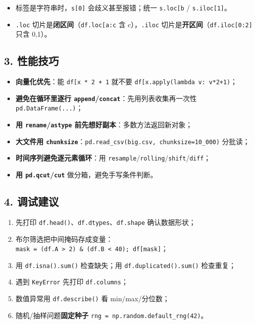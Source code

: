 \begin{itemize}
\tightlist
\item
  标签是字符串时，\texttt{s{[}0{]}} 会歧义甚至报错；统一
  \texttt{s.loc{[}\textquotesingle{}b\textquotesingle{}{]}} /
  \texttt{s.iloc{[}1{]}}。
\item
  \texttt{.loc}
  切片是\textbf{闭区间}（\texttt{df.loc{[}\textquotesingle{}a\textquotesingle{}:\textquotesingle{}c\textquotesingle{}{]}}
  含 c），\texttt{.iloc}
  切片是\textbf{开区间}（\texttt{df.iloc{[}0:2{]}} 只含 0,1）。
\end{itemize}

\subsection{3. 性能技巧}\label{ux6027ux80fdux6280ux5de7-3}

\begin{itemize}
\tightlist
\item
  \textbf{向量化优先}：能
  \texttt{df{[}\textquotesingle{}x\textquotesingle{}{]}\ *\ 2\ +\ 1}
  就不要
  \texttt{df{[}\textquotesingle{}x\textquotesingle{}{]}.apply(lambda\ v:\ v*2+1)}；
\item
  \textbf{避免在循环里逐行
  \texttt{append}/\texttt{concat}}：先用列表收集再一次性
  \texttt{pd.DataFrame(...)}；
\item
  \textbf{用 \texttt{rename}/\texttt{astype}
  前先想好副本}：多数方法返回新对象；
\item
  \textbf{大文件用
  \texttt{chunksize}}：\texttt{pd.read\_csv(\textquotesingle{}big.csv\textquotesingle{},\ chunksize=10\_000)}
  分批读；
\item
  \textbf{时间序列避免逐元素循环}：用
  \texttt{resample}/\texttt{rolling}/\texttt{shift}/\texttt{diff}；
\item
  \textbf{用 \texttt{pd.qcut}/\texttt{cut}} 做分箱，避免手写条件判断。
\end{itemize}

\subsection{4. 调试建议}\label{ux8c03ux8bd5ux5efaux8bae-3}

\begin{enumerate}
\def\labelenumi{\arabic{enumi}.}
\tightlist
\item
  先打印 \texttt{df.head()}、\texttt{df.dtypes}、\texttt{df.shape}
  确认数据形状；
\item
  布尔筛选把中间掩码存成变量：\texttt{mask\ =\ (df.A\ \textgreater{}\ 2)\ \&\ (df.B\ \textless{}\ 40);\ df{[}mask{]}}；
\item
  用 \texttt{df.isna().sum()} 检查缺失；用
  \texttt{df.duplicated().sum()} 检查重复；
\item
  遇到 \texttt{KeyError} 先打印 \texttt{df.columns}；
\item
  数值异常用 \texttt{df.describe()} 看 min/max/分位数；
\item
  随机/抽样问题\textbf{固定种子}
  \texttt{rng\ =\ np.random.default\_rng(42)}。
\end{enumerate}

